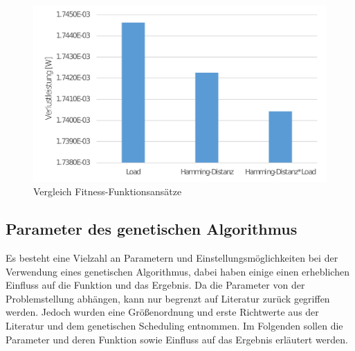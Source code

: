 \begin{figure}[H] 
	\centering
	\includegraphics[width=\textwidth]{fig/compare_genetic_modes.pdf}
	\caption{Vergleich Fitness-Funktionsansätze}
	\label{fig:compare_genetic_modes}
\end{figure}
 
\subsection{Parameter des genetischen Algorithmus}
\label{cap:parameter}
Es besteht eine Vielzahl an Parametern und Einstellungsmöglichkeiten bei der Verwendung eines genetischen Algorithmus, dabei haben einige einen erheblichen Einfluss auf die Funktion und das Ergebnis. Da die Parameter von der Problemstellung abhängen, kann nur begrenzt auf Literatur zurück gegriffen werden. Jedoch wurden eine Größenordnung und erste Richtwerte aus der Literatur \cite{grefenstette1986optimization} und dem genetischen Scheduling entnommen. Im Folgenden sollen die Parameter und deren Funktion sowie Einfluss auf das Ergebnis erläutert werden.


